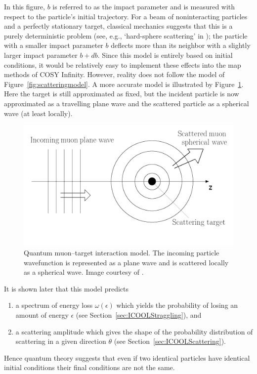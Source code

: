 In this figure, $b$ is referred to as the impact parameter and is measured with respect to the particle's initial trajectory. For a beam of noninteracting particles and a perfectly stationary target, classical mechanics suggests that this is a purely deterministic problem (see, e.g., `hard-sphere scattering' in \cite{griffithsqm}); the particle with a smaller impact parameter $b$ deflects more than its neighbor with a slightly larger impact parameter $b+db$. Since this model is entirely based on initial conditions, it would be relatively easy to implement these effects into the map methods of COSY Infinity. However, reality does not follow the model of Figure~\ref{fig:scatteringmodel}. A more accurate model is illustrated by Figure~\ref{fig:scatteringmodel2}. Here the target is still approximated as fixed, but the incident particle is now approximated as a travelling plane wave and the scattered particle as a spherical wave (at least locally).
\begin{figure}
  \centering
    \includegraphics[width=\textwidth]{Figures/scattering_model_2} 
  \caption[Quantum muon--target interaction model.]{Quantum muon--target interaction model. The incoming particle wavefunction is represented as a plane wave and is scattered locally as a spherical wave. Image courtesy of \cite{griffithsqm}.}
  \label{fig:scatteringmodel2}
\end{figure}
It is shown later that this model predicts 
\begin{enumerate}
\item a spectrum of energy loss $\omega(\epsilon)$ which yields the probability of losing an amount of energy $\epsilon$ (see Section~\ref{sec:ICOOLStraggling}), and
\item a scattering amplitude which gives the shape of the probability distribution of scattering in a given direction $\theta$ (see Section~\ref{sec:ICOOLScattering}).
\end{enumerate}
Hence quantum theory suggests that even if two identical particles have identical initial conditions their final conditions are not the same.

